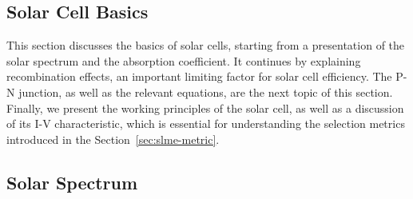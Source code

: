\begin{refsection}
%


\section{Solar Cell Basics} \label{sec:slme-basics}

This section discusses the basics of solar cells, starting from a presentation of the solar spectrum and the absorption coefficient. It continues by explaining recombination effects, an important limiting factor for solar cell efficiency. The P-N junction, as well as the relevant equations, are the next topic of this section. Finally, we present the working principles of the solar cell, as well as a discussion of its I-V characteristic, which is essential for understanding the selection metrics introduced in the Section~\ref{sec:slme-metric}.

\subsection{Solar Spectrum}


\end{refsection}
